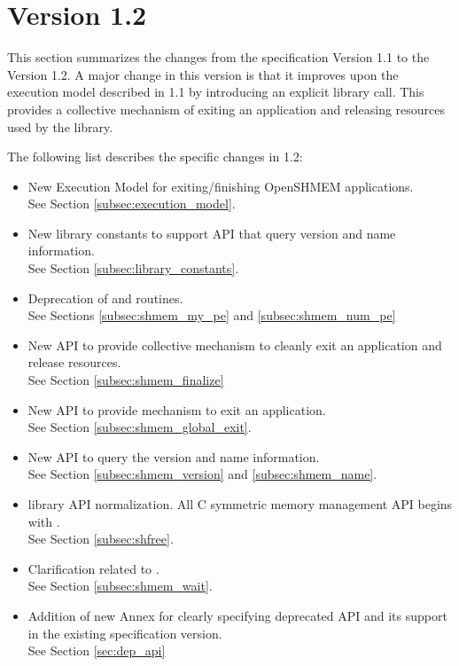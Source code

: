 \section{Version 1.2}
This section summarizes the changes from the \openshmem specification Version 1.1 to the Version 1.2.  
A major change in this version is that it improves upon the execution model described in 1.1 by introducing an explicit  library call. This provides a collective mechanism of exiting an \openshmem application and releasing resources used by the library.  



The following list describes the specific changes in 1.2:
\begin{itemize}
\item New Execution Model for exiting/finishing OpenSHMEM applications.
\\See Section  \ref{subsec:execution_model}.
\item New library constants to support API that query version and name information. 
\\See Section \ref{subsec:library_constants}.
\item Deprecation of  and  routines.
\\See Sections \ref{subsec:shmem_my_pe} and \ref{subsec:shmem_num_pe}
\item New API  to provide collective mechanism to cleanly exit an \openshmem application and release resources.
\\See Section \ref{subsec:shmem_finalize}
\item New API  to provide mechanism to exit an \openshmem application.
\\See Section \ref{subsec:shmem_global_exit}.
\item New API to query the version and name information. 
\\See Section \ref{subsec:shmem_version} and \ref{subsec:shmem_name}.
\item \openshmem library API normalization. All C symmetric memory management API begins with  .
\\See Section \ref{subsec:shfree}.
\item Clarification related to .
\\See Section \ref{subsec:shmem_wait}.
\item Addition of new Annex for clearly specifying deprecated API and its support in the existing specification version.
\\See Section \ref{sec:dep_api}

\end{itemize}
